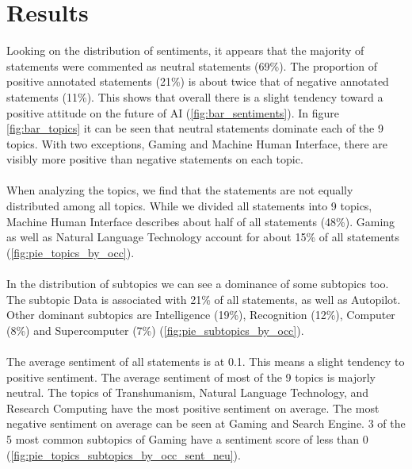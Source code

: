 \section{Results}
Looking on the distribution of sentiments, it appears that the majority of statements were commented as neutral statements (69\%).
The proportion of positive annotated statements (21\%) is about twice that of negative annotated statements (11\%).
This shows that overall there is a slight tendency toward a positive attitude on the future of AI (\autoref{fig:bar_sentiments}).
In figure \ref{fig:bar_topics} it can be seen that neutral statements dominate each of the 9 topics.
With two exceptions, Gaming and Machine Human Interface, there are visibly more positive than negative statements on each topic.
\\
\\
When analyzing the topics, we find that the statements are not equally distributed among all topics.
While we divided all statements into 9 topics, Machine Human Interface describes about half of all statements (48\%).
Gaming as well as Natural Language Technology account for about 15\% of all statements (\autoref{fig:pie_topics_by_occ}).
\\
\\
In the distribution of subtopics we can see a dominance of some subtopics too.
The subtopic Data is associated with 21\% of all statements, as well as Autopilot.
Other dominant subtopics are Intelligence (19\%), Recognition (12\%), Computer (8\%) and Supercomputer (7\%) (\autoref{fig:pie_subtopics_by_occ}).
\\
\\
The average sentiment of all statements is at 0.1.
This means a slight tendency to positive sentiment.
The average sentiment of most of the 9 topics is majorly neutral.
The topics of Transhumanism, Natural Language Technology, and Research Computing have the most positive sentiment on average.
The most negative sentiment on average can be seen at Gaming and Search Engine.
3 of the 5 most common subtopics of Gaming have a sentiment score of less than 0 (\autoref{fig:pie_topics_subtopics_by_occ_sent_neu}).
